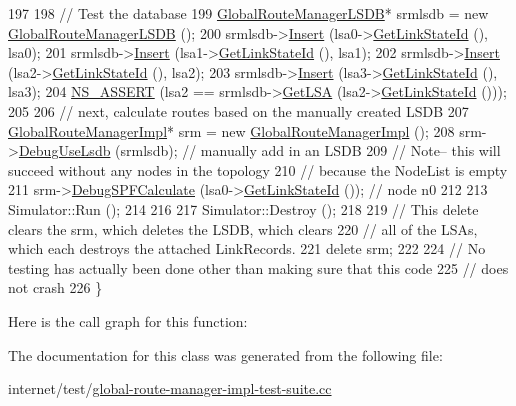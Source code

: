 \begin{DoxyCode}
197 
198   \textcolor{comment}{// Test the database }
199   \hyperlink{classns3_1_1GlobalRouteManagerLSDB}{GlobalRouteManagerLSDB}* srmlsdb = \textcolor{keyword}{new} 
      \hyperlink{classns3_1_1GlobalRouteManagerLSDB}{GlobalRouteManagerLSDB} ();
200   srmlsdb->\hyperlink{classns3_1_1GlobalRouteManagerLSDB_a832fe8b5361c7b4f680edfd98763346d}{Insert} (lsa0->\hyperlink{classns3_1_1GlobalRoutingLSA_afc7dd85af408f8b9236bd73e1a78f5bd}{GetLinkStateId} (), lsa0);
201   srmlsdb->\hyperlink{classns3_1_1GlobalRouteManagerLSDB_a832fe8b5361c7b4f680edfd98763346d}{Insert} (lsa1->\hyperlink{classns3_1_1GlobalRoutingLSA_afc7dd85af408f8b9236bd73e1a78f5bd}{GetLinkStateId} (), lsa1);
202   srmlsdb->\hyperlink{classns3_1_1GlobalRouteManagerLSDB_a832fe8b5361c7b4f680edfd98763346d}{Insert} (lsa2->\hyperlink{classns3_1_1GlobalRoutingLSA_afc7dd85af408f8b9236bd73e1a78f5bd}{GetLinkStateId} (), lsa2);
203   srmlsdb->\hyperlink{classns3_1_1GlobalRouteManagerLSDB_a832fe8b5361c7b4f680edfd98763346d}{Insert} (lsa3->\hyperlink{classns3_1_1GlobalRoutingLSA_afc7dd85af408f8b9236bd73e1a78f5bd}{GetLinkStateId} (), lsa3);
204   \hyperlink{assert_8h_a6dccdb0de9b252f60088ce281c49d052}{NS\_ASSERT} (lsa2 == srmlsdb->\hyperlink{classns3_1_1GlobalRouteManagerLSDB_a3504bf3573cc64a056835684c41e1aa5}{GetLSA} (lsa2->\hyperlink{classns3_1_1GlobalRoutingLSA_afc7dd85af408f8b9236bd73e1a78f5bd}{GetLinkStateId} ()));
205 
206   \textcolor{comment}{// next, calculate routes based on the manually created LSDB}
207   \hyperlink{classns3_1_1GlobalRouteManagerImpl}{GlobalRouteManagerImpl}* srm = \textcolor{keyword}{new} \hyperlink{classns3_1_1GlobalRouteManagerImpl}{GlobalRouteManagerImpl} ();
208   srm->\hyperlink{classns3_1_1GlobalRouteManagerImpl_a9e287c00be9cb2d6d5cbb1a7cbdb40e9}{DebugUseLsdb} (srmlsdb);  \textcolor{comment}{// manually add in an LSDB}
209   \textcolor{comment}{// Note-- this will succeed without any nodes in the topology}
210   \textcolor{comment}{// because the NodeList is empty}
211   srm->\hyperlink{classns3_1_1GlobalRouteManagerImpl_aaa692001ef22911e3483583b0de78909}{DebugSPFCalculate} (lsa0->\hyperlink{classns3_1_1GlobalRoutingLSA_afc7dd85af408f8b9236bd73e1a78f5bd}{GetLinkStateId} ());  \textcolor{comment}{// node n0}
212 
213   Simulator::Run ();
214 
216 
217   Simulator::Destroy ();
218 
219   \textcolor{comment}{// This delete clears the srm, which deletes the LSDB, which clears }
220   \textcolor{comment}{// all of the LSAs, which each destroys the attached LinkRecords.}
221   \textcolor{keyword}{delete} srm;
222 
224   \textcolor{comment}{// No testing has actually been done other than making sure that this code}
225   \textcolor{comment}{// does not crash}
226 \}
\end{DoxyCode}


Here is the call graph for this function\+:




The documentation for this class was generated from the following file\+:\begin{DoxyCompactItemize}
\item 
internet/test/\hyperlink{global-route-manager-impl-test-suite_8cc}{global-\/route-\/manager-\/impl-\/test-\/suite.\+cc}\end{DoxyCompactItemize}
